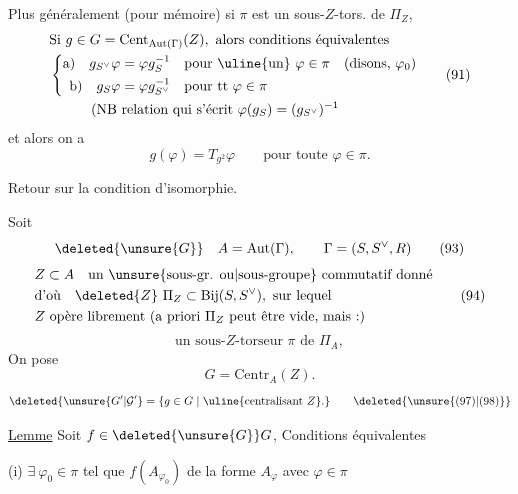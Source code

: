 Plus généralement (pour mémoire) si $\pi$ est un sous-$Z$-tors. de $\Pi_Z$,
\[
\begin{aligned}
&\text{Si }g\in G=\mathrm{Cent}_{\mathrm{Aut}(\Gamma)}(Z),\text{ alors conditions équivalentes}\\
&\left\{\begin{aligned}
\text{a)}\quad g_{S^\vee}\varphi&=\varphi g_S^{-1} &&\text{pour \uline{un} }\varphi\in\pi\quad(\text{disons, }\varphi_0)\\
\text{b)}\quad g_S\varphi&=\varphi g_{S^\vee}^{-1} &&\text{pour tt }\varphi\in\pi
\end{aligned}\right.\\
&\hspace{3em}(\text{NB relation qui s'écrit }\varphi(g_S)=(g_{S^\vee})^{-1}
\end{aligned}\tag*{(91)}
\]
et alors on  a
\[
 g(\varphi)=T_{g^2}\varphi\qquad\text{pour toute }\varphi\in\pi.
 \tag*{(92)}
\]

 Retour sur la condition d'isomorphie.

Soit
\[
 \deleted{\unsure{G}}\quad A=\mathrm{Aut}(\Gamma),\qquad
 \Gamma=(S,S^\vee,R) \tag*{(93)}
\]
\[
\begin{aligned}
 &Z\subset A\quad\text{un \unsure{sous-gr. ou|sous-groupe} commutatif donné}\\
 &\text{d'où}\quad\deleted{Z}\ \Pi_Z\subset\mathrm{Bij}(S,S^\vee),\ \text{sur lequel}\\
 &Z\text{ opère librement (a priori }\Pi_Z\text{ peut être vide, mais :)}
\end{aligned}\tag*{(94)}
\]
\[
 \text{un sous-}Z\text{-torseur }\pi\text{ de }\Pi_A,\tag*{(95)}
\]
On pose
\[
 G=\mathrm{Centr}_A(Z). \tag*{(96)}
\]
\[
 \deleted{\unsure{G'|\mathcal G'}=\{g\in G\mid\uline{\text{centralisant }Z}.}
 \tag*{\deleted{\unsure{(97)|(98)}}}
\]

\uline{Lemme} Soit $f\in\deleted{\unsure{G}}G$, Conditions équivalentes

(i) $\exists\ \varphi_0\in\pi$ tel que $f(A_{\varphi_0})$ de  la forme $A_\varphi$
avec $\varphi\in\pi$

